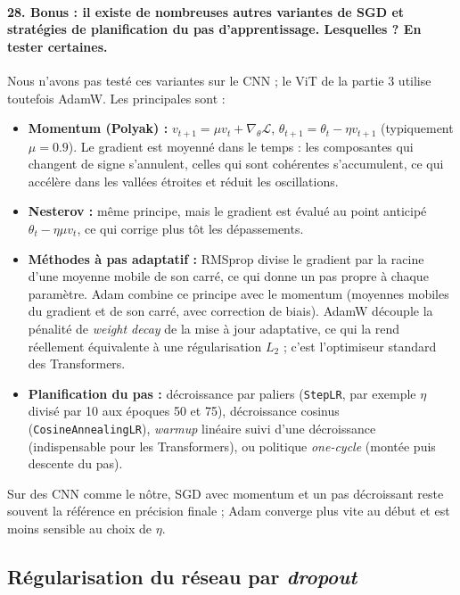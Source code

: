 \documentclass{report}
\begin{document}
\paragraph{28. Bonus : il existe de nombreuses autres variantes de SGD et stratégies de planification du pas d'apprentissage. Lesquelles ? En tester certaines.}
 Nous n'avons pas testé ces variantes sur le CNN ; le ViT de la partie 3 utilise toutefois AdamW. Les principales sont :
\begin{itemize}
    \item \textbf{Momentum (Polyak) :} $v_{t+1} = \mu v_t + \nabla_\theta \mathcal{L}$, $\theta_{t+1} = \theta_t - \eta v_{t+1}$ (typiquement $\mu = 0.9$). Le gradient est moyenné dans le temps : les composantes qui changent de signe s'annulent, celles qui sont cohérentes s'accumulent, ce qui accélère dans les vallées étroites et réduit les oscillations.
    \item \textbf{Nesterov :} même principe, mais le gradient est évalué au point anticipé $\theta_t - \eta \mu v_t$, ce qui corrige plus tôt les dépassements.
    \item \textbf{Méthodes à pas adaptatif :} RMSprop divise le gradient par la racine d'une moyenne mobile de son carré, ce qui donne un pas propre à chaque paramètre. Adam combine ce principe avec le momentum (moyennes mobiles du gradient et de son carré, avec correction de biais). AdamW découple la pénalité de \textit{weight decay} de la mise à jour adaptative, ce qui la rend réellement équivalente à une régularisation $L_2$ ; c'est l'optimiseur standard des Transformers.
    \item \textbf{Planification du pas :} décroissance par paliers (\texttt{StepLR}, par exemple $\eta$ divisé par 10 aux époques 50 et 75), décroissance cosinus (\texttt{CosineAnnealingLR}), \textit{warmup} linéaire suivi d'une décroissance (indispensable pour les Transformers), ou politique \textit{one-cycle} (montée puis descente du pas).
\end{itemize}
Sur des CNN comme le nôtre, SGD avec momentum et un pas décroissant reste souvent la référence en précision finale ; Adam converge plus vite au début et est moins sensible au choix de $\eta$.

\subsection{Régularisation du réseau par \textit{dropout}}
\end{document}
